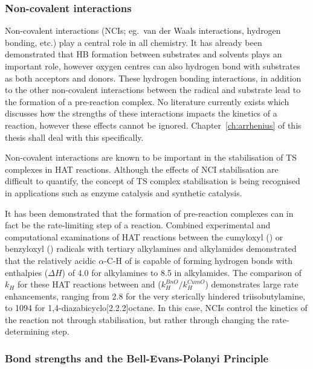 \subsubsection{Non-covalent interactions}

Non-covalent interactions (NCIs; eg.\ van der Waals interactions, hydrogen
bonding, etc.)  play a central role in all chemistry. It has already been
demonstrated that HB formation between substrates and solvents plays an
important role, however oxygen centres can also hydrogen bond with substrates as
both acceptors and donors.\cite{Johnson2009a} These hydrogen bonding
interactions, in addition to the other non-covalent interactions between the
radical and substrate lead to the formation of a pre-reaction complex. No
literature currently exists which discusses how the strengths of these
interactions impacts the kinetics of a reaction, however these effects cannot be
ignored. Chapter~\ref{ch:arrhenius} of this thesis shall deal with this specifically.

Non-covalent interactions are known to be important in the stabilisation of TS
complexes in HAT reactions.\cite{DiLabio2005,DiLabio2007} Although the effects
of NCI stabilisation are difficult to quantify, the concept of TS complex
stabilisation is being recognised in applications such as enzyme
catalysis\cite{Uyeda2011} and synthetic catalysis.\cite{Bakr2016}

It has been demonstrated that the formation of pre-reaction complexes can in
fact be the rate-limiting step of a
reaction.\cite{Salamone2011,Salamone2011a,Salamone2013a} Combined experimental
and computational examinations of HAT reactions between the cumyloxyl (\cumo) or
benzyloxyl (\bno) radicals with tertiary alkylamines and alkylamides
demonstrated that the relatively acidic $\alpha$-C-H of \bno is capable of
forming hydrogen bonds with enthalpies ($\Delta H$) of 4.0 \kcalmol for
alkylamines to 8.5 \kcalmol in alkylamides. The comparison of $k_H$ for these
HAT reactions between \cumo and \bno ($k_H^{BnO}/k_H^{CumO}$) demonstrates large
rate enhancements, ranging from 2.8 for the very sterically hindered
triisobutylamine, to 1094 for 1,4-diazabicyclo[2.2.2]octane. In this case, NCIs
control the kinetics of the reaction not through stabilisation, but rather
through changing the rate-determining step.


\subsubsection{Bond strengths and the Bell-Evans-Polanyi Principle}

